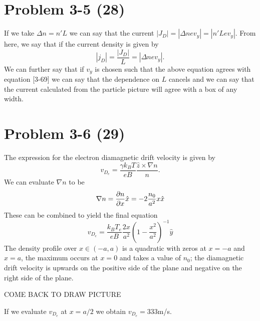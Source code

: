 \section*{Problem 3-5 (28)}
\label{sec:3-5}
If we take \(\Delta n = n'L \) we can say that the current \(|J_D| = |\Delta nev_y| = |n'Lev_y|\). From here, we say that if the current density is given by 
\begin{equation*}
	|j_D| = \dfrac{|J_D|}{L} = |\Delta nev_y|.
\end{equation*}
We can further say that if \(v_y \) is chosen such that the above equation agrees with equation [3-69] we can say that the dependence on \(L \) cancels and we can say that the current calculated from the particle picture will agree with a box of any width.

\section*{Problem 3-6 (29)}
\label{sec:3-6}
The expression for the electron diamagnetic drift velocity is given by
\begin{equation*}
	v_{D_e} = \dfrac{\gamma k_BT}{eB}\dfrac{\hat{z}\times\nabla n}{n}.
\end{equation*}
We can evaluate \(\nabla n \) to be
\begin{equation*}
	\nabla n = \frac{\partial n}{\partial x}\hat{x} = -2\dfrac{n_0}{a^2}x\hat{x}
\end{equation*}
These can be combined to yield the final equation
\begin{equation*}
	v_{D_e} = \dfrac{k_BT_e}{eB}\dfrac{2x}{a^2}\left(1 - \dfrac{x^2}{a^2}\right)^{-1}\hat{y}
\end{equation*}
The density profile over \(x \in (-a,a) \) is a quadratic with zeros at \(x=-a\) and \(x=a\), the maximum occurs at \(x=0\) and takes a value of \(n_0\); the diamagnetic drift velocity is upwards on the positive side of the plane and negative on the right side of the plane. 

COME BACK TO DRAW PICTURE

If we evaluate \(v_{D_e}\) at \(x = a/2\) we obtain \(v_{D_e} = 333 \)m/s.

